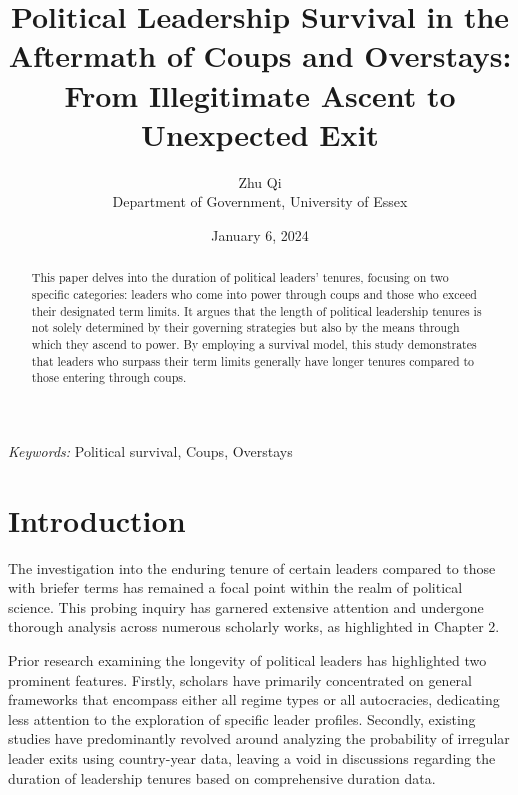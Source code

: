 \documentclass[
  12pt,
  a4paper,
  12pt]{article}
\begin{document}
\def\spacingset#1{\renewcommand{\baselinestretch}%
{#1}\small\normalsize} \spacingset{1}



\date{January 6, 2024}
\title{\bf Political Leadership Survival in the Aftermath of Coups and
Overstays: From Illegitimate Ascent to Unexpected Exit}
\author{
Zhu Qi\\
Department of Government, University of Essex\\
}
\maketitle

\bigskip
\bigskip
\begin{abstract}
This paper delves into the duration of political leaders' tenures,
focusing on two specific categories: leaders who come into power through
coups and those who exceed their designated term limits. It argues that
the length of political leadership tenures is not solely determined by
their governing strategies but also by the means through which they
ascend to power. By employing a survival model, this study demonstrates
that leaders who surpass their term limits generally have longer tenures
compared to those entering through coups.
\end{abstract}

\noindent%
{\it Keywords:} Political survival, Coups, Overstays
\vfill

\newpage
\spacingset{1.9} %

\section{Introduction}\label{introduction}

The investigation into the enduring tenure of certain leaders compared
to those with briefer terms has remained a focal point within the realm
of political science. This probing inquiry has garnered extensive
attention and undergone thorough analysis across numerous scholarly
works, as highlighted in Chapter 2.

Prior research examining the longevity of political leaders has
highlighted two prominent features. Firstly, scholars have primarily
concentrated on general frameworks that encompass either all regime
types or all autocracies, dedicating less attention to the exploration
of specific leader profiles. Secondly, existing studies have
predominantly revolved around analyzing the probability of irregular
leader exits using country-year data, leaving a void in discussions
regarding the duration of leadership tenures based on comprehensive
duration data.
\end{document}
